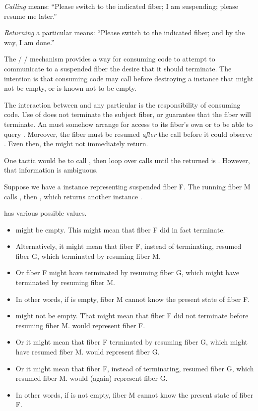 \emph{Calling} \resume means: ``Please switch to the indicated fiber; I
am suspending; please resume me later.''

\emph{Returning} a particular \fiber means: ``Please switch to the indicated
fiber; and by the way, I am done.''

The \getsource\xspace / \gettoken\xspace / \reqstop mechanism provides a way for
consuming code to attempt to communicate to a suspended fiber the desire that
it should terminate. The intention is that consuming code may call \reqstop
before destroying a \fiber instance that might not be empty, or is known not
to be empty.

The interaction between \reqstop and any particular \entryfn is the
responsibility of consuming code. Use of \reqstop does not terminate the
subject fiber, or guarantee that the fiber will terminate. An \entryfn must
somehow arrange for access to its fiber's own 
or  to be able to query . Moreover,
the fiber must be resumed \emph{after} the \reqstop call before it could
observe . Even then, the \entryfn might not immediately
return.

One tactic would be to call \reqstop, then loop over \allresume calls until
the returned \fiber is . However, that information is ambiguous.

Suppose we have a \fiber instance  representing suspended fiber F. The
running fiber M calls , then , which
returns another \fiber instance .

 has various possible values.

\begin{itemize}
    \item {} might be empty. This might mean that fiber F did in fact
          terminate.
    \item Alternatively, it might mean that fiber F, instead of terminating,
          resumed fiber G, which terminated by resuming fiber M.
    \item Or fiber F might have terminated by resuming fiber G, which might
          have terminated by resuming fiber M.
    \item In other words, if  is empty, fiber M cannot know the
          present state of fiber F.
    \item {} might not be empty. That might mean that fiber F did not
          terminate before resuming fiber M.  would represent fiber F.
    \item Or it might mean that fiber F terminated by resuming fiber G, which
          might have resumed fiber M.  would represent fiber G.
    \item Or it might mean that fiber F, instead of terminating, resumed fiber
          G, which resumed fiber M.  would (again) represent fiber G.
    \item In other words, if  is not empty, fiber M cannot know the
          present state of fiber F.
\end{itemize}

